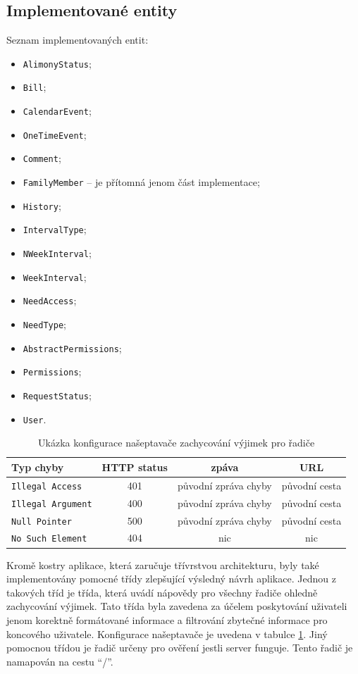     \subsection{Implementované entity}\label{analyza:implementace:tridy}
        Seznam implementovaných entit:
        \begin{itemize}
            \item \texttt{AlimonyStatus};
            \item \texttt{Bill};
            \item \texttt{CalendarEvent};
            \item \texttt{OneTimeEvent};
            \item \texttt{Comment};
            \item \texttt{FamilyMember} -- je přítomná jenom část implementace;
            \item \texttt{History};
            \item \texttt{IntervalType};
            \item \texttt{NWeekInterval};
            \item \texttt{WeekInterval};
            \item \texttt{NeedAccess};
            \item \texttt{NeedType};
            \item \texttt{AbstractPermissions};
            \item \texttt{Permissions};
            \item \texttt{RequestStatus};
            \item \texttt{User}.
        \end{itemize}
        
        \begin{table}\centering
	    \caption[Konfigurace našeptavače pro řadiče]{Ukázka konfigurace našeptavače zachycování výjimek pro řadiče}\label{tab:excpetion-handler1}
	    \begin{tabular}{|l|c|c|c|}\hline
		  Typ chyby		& HTTP status		& zpáva	& URL	\tabularnewline \hline \hline
		  \texttt{Illegal Access}	& 401	& původní zpráva chyby		& původní cesta     \tabularnewline \hline
		  \texttt{Illegal Argument}	& 400	& původní zpráva chyby		& původní cesta     \tabularnewline \hline
		  \texttt{Null Pointer}	& 500	& původní zpráva chyby		& původní cesta     \tabularnewline \hline
		  \texttt{No Such Element}	& 404	& nic		& nic     \tabularnewline \hline
	    \end{tabular}
        \end{table}
        Kromě kostry aplikace, která zaručuje třívrstvou architekturu, byly také implementovány pomocné třídy zlepšující výsledný návrh aplikace. Jednou z takových tříd je třída, která uvádí nápovědy pro všechny řadiče ohledně zachycování výjimek. Tato třída byla zavedena za účelem poskytování uživateli jenom korektně formátované informace a filtrování zbytečné informace pro koncového uživatele. Konfigurace našeptavače je uvedena v tabulce \ref{tab:excpetion-handler1}. Jiný pomocnou třídou je řadič určeny pro ověření jestli server funguje. Tento řadič je namapován na cestu \enquote{/}.
        

